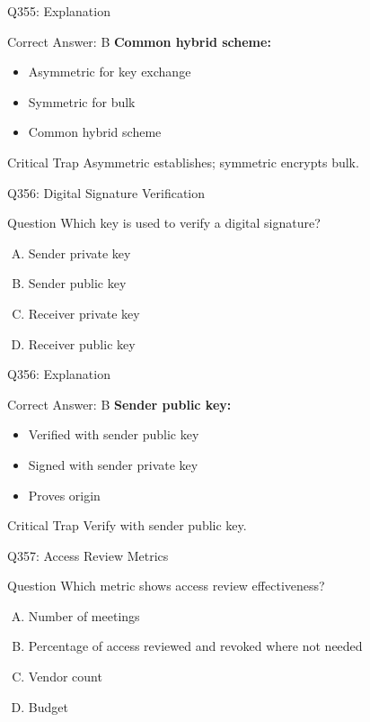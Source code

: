 \documentclass{beamer}
\begin{document}
	\begin{frame}{Q355: Explanation}
		\begin{block}{Correct Answer: B}
			\textbf{Common hybrid scheme:}
			\begin{itemize}
				\item Asymmetric for key exchange
				\item Symmetric for bulk
				\item Common hybrid scheme
			\end{itemize}
		\end{block}
		\begin{alertblock}{Critical Trap}
			Asymmetric establishes; symmetric encrypts bulk.
		\end{alertblock}
	\end{frame}
	
	\begin{frame}{Q356: Digital Signature Verification}
		\begin{block}{Question}
			Which key is used to verify a digital signature?
		\end{block}
		\begin{enumerate}[(A)]
			\item Sender private key
			\item Sender public key
			\item Receiver private key
			\item Receiver public key
		\end{enumerate}
	\end{frame}
	
	\begin{frame}{Q356: Explanation}
		\begin{block}{Correct Answer: B}
			\textbf{Sender public key:}
			\begin{itemize}
				\item Verified with sender public key
				\item Signed with sender private key
				\item Proves origin
			\end{itemize}
		\end{block}
		\begin{alertblock}{Critical Trap}
			Verify with sender public key.
		\end{alertblock}
	\end{frame}
	
	\begin{frame}{Q357: Access Review Metrics}
		\begin{block}{Question}
			Which metric shows access review effectiveness?
		\end{block}
		\begin{enumerate}[(A)]
			\item Number of meetings
			\item Percentage of access reviewed and revoked where not needed
			\item Vendor count
			\item Budget
		\end{enumerate}
	\end{frame}
	
\end{document}
